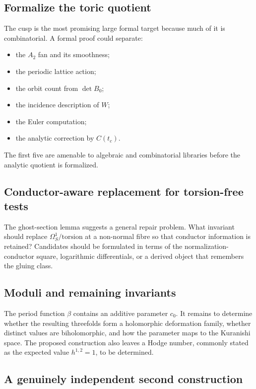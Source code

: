 \documentclass[11pt,reqno]{amsart}
\numberwithin{equation}{section}
\theoremstyle{definition}
\begin{document}
\subsection{Formalize the toric quotient}

The cusp is the most promising large formal target because much of it is combinatorial. A formal proof could separate:
\begin{itemize}
\item the $A_2$ fan and its smoothness;
\item the periodic lattice action;
\item the orbit count from $\det B_0$;
\item the incidence description of $W$;
\item the Euler computation;
\item the analytic correction by $C(t_c)$.
\end{itemize}
The first five are amenable to algebraic and combinatorial libraries before the analytic quotient is formalized.

\subsection{Conductor-aware replacement for torsion-free tests}

The ghost-section lemma suggests a general repair problem. What invariant should replace $\Omega_S^1/\mathrm{torsion}$ at a non-normal fibre so that conductor information is retained? Candidates should be formulated in terms of the normalization-conductor square, logarithmic differentials, or a derived object that remembers the gluing class.

\subsection{Moduli and remaining invariants}

The period function $\beta$ contains an additive parameter $c_0$. It remains to determine whether the resulting threefolds form a holomorphic deformation family, whether distinct values are biholomorphic, and how the parameter maps to the Kuranishi space. The proposed construction also leaves a Hodge number, commonly stated as the expected value $h^{1,2}=1$, to be determined.

\subsection{A genuinely independent second construction}
\end{document}
